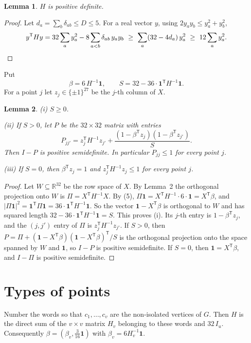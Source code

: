 \documentclass[11pt,a4paper]{article}
\newtheorem{lemma}{Lemma}
\newcommand{\abs}[1]{\lvert #1\rvert}
\newcommand{\one}{\mathbf{1}}
\newcommand{\T}{^{\mathsf T}}
\begin{document}
\begin{lemma}
$H$ is positive definite.
\end{lemma}

\begin{proof}
Let $d_a=\sum_b\delta_{ab}\le D\le 5$. For a real vector $y$, using
$2y_ay_b\le y_a^2+y_b^2$,
\[
y\T Hy=32\sum_a y_a^2-8\sum_{a<b}\delta_{ab}\,y_ay_b
\ \ge\ \sum_a(32-4d_a)\,y_a^2\ \ge\ 12\sum_a y_a^2 . \qedhere
\]
\end{proof}

Put
\[
\beta=6\,H^{-1}\one,\qquad S=32-36\cdot\one\T H^{-1}\one .
\]
For a point $j$ let $z_j\in\{\pm 1\}^{27}$ be the $j$-th column of $X$.

\begin{lemma}
\textup{(i)} $S\ge 0$.

\textup{(ii)} If $S>0$, let $P$ be the $32\times 32$ matrix with entries
\[
P_{jj'}=z_j\T H^{-1}z_{j'}+\frac{(1-\beta\T z_j)(1-\beta\T z_{j'})}{S}.
\]
Then $I-P$ is positive semidefinite. In particular $P_{jj}\le 1$ for every
point $j$.

\textup{(iii)} If $S=0$, then $\beta\T z_j=1$ and $z_j\T H^{-1}z_j\le 1$
for every point $j$.
\end{lemma}

\begin{proof}
Let $W\subseteq\mathbb R^{32}$ be the row space of $X$. By Lemma~2 the
orthogonal projection onto $W$ is $\Pi=X\T H^{-1}X$. By (5),
$\Pi\one=X\T H^{-1}\cdot 6\cdot\one=X\T\beta$, and
$\abs{\Pi\one}^2=\one\T\Pi\one=36\cdot\one\T H^{-1}\one$. So the vector
$\one-X\T\beta$ is orthogonal to $W$ and has squared length $32-36\cdot
\one\T H^{-1}\one=S$. This proves (i). Its $j$-th entry is $1-\beta\T z_j$,
and the $(j,j')$ entry of $\Pi$ is $z_j\T H^{-1}z_{j'}$. If $S>0$, then
$P=\Pi+(\one-X\T\beta)(\one-X\T\beta)\T/S$ is the orthogonal projection
onto the space spanned by $W$ and $\one$, so $I-P$ is positive
semidefinite. If $S=0$, then $\one=X\T\beta$, and $I-\Pi$ is positive
semidefinite.
\end{proof}

\section{Types of points}

Number the words so that $c_1,\dots,c_v$ are the non-isolated vertices of
$G$. Then $H$ is the direct sum of the $v\times v$ matrix $H_v$ belonging to
these words and $32\,I_u$. Consequently $\beta=(\beta_v,\frac3{16}\one)$
with $\beta_v=6H_v^{-1}\one$.
\end{document}
